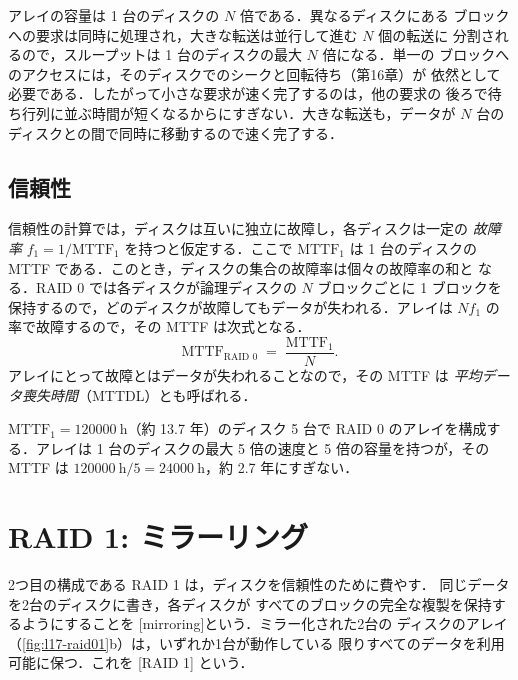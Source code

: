 \documentclass[../main.tex]{subfiles}
\begin{document}
アレイの容量は 1 台のディスクの $N$ 倍である．異なるディスクにある
ブロックへの要求は同時に処理され，大きな転送は並行して進む $N$ 個の転送に
分割されるので，スループットは 1 台のディスクの最大 $N$ 倍になる．単一の
ブロックへのアクセスには，そのディスクでのシークと回転待ち（第16章）が
依然として必要である．したがって小さな要求が速く完了するのは，他の要求の
後ろで待ち行列に並ぶ時間が短くなるからにすぎない．大きな転送も，データが
$N$ 台のディスクとの間で同時に移動するので速く完了する．

\subsection{信頼性}

信頼性の計算では，ディスクは互いに独立に故障し，各ディスクは一定の
\emph{故障率} $f_1 = 1/\mathrm{MTTF}_1$ を持つと仮定する．ここで
$\mathrm{MTTF}_1$ は 1 台のディスクの MTTF である．このとき，ディスクの集合の故障率は個々の故障率の和と
なる．RAID 0 では各ディスクが論理ディスクの $N$ ブロックごとに 1 ブロックを
保持するので，どのディスクが故障してもデータが失われる．アレイは $N f_1$
の率で故障するので，その MTTF は次式となる．
\begin{equation}
  \mathrm{MTTF}_{\text{RAID 0}} \;=\; \frac{\mathrm{MTTF}_1}{N} .
  \label{eq:l17-raid0}
\end{equation}
アレイにとって故障とはデータが失われることなので，その MTTF は
\emph{平均データ喪失時間}（MTTDL）とも呼ばれる．

\begin{example}
  \label{ex:l17-raid0}
  $\mathrm{MTTF}_1 = \SI{120000}{\hour}$（約 13.7 年）のディスク 5 台で
  RAID 0 のアレイを構成する．アレイは 1 台のディスクの最大 5 倍の速度と
  5 倍の容量を持つが，その MTTF は
  $\SI{120000}{\hour}/5 = \SI{24000}{\hour}$，約 2.7 年にすぎない．
\end{example}

\section{RAID 1: ミラーリング}
\label{sec:l17-raid1}

2つ目の構成である RAID 1 は，ディスクを信頼性のために費やす．
同じデータを2台のディスクに書き，各ディスクが
すべてのブロックの完全な複製を保持するようにすることを
[mirroring]という．ミラー化された2台の
ディスクのアレイ（\cref{fig:l17-raid01}b）は，いずれか1台が動作している
限りすべてのデータを利用可能に保つ．これを [RAID 1] という．
\end{document}
